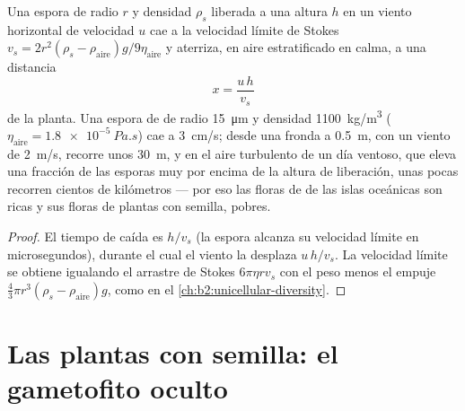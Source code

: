 \begin{theorem}\label{thm:b2:plant-life-cycles:dispersal}
Una espora de radio $r$ y densidad $\rho_s$ liberada a una altura $h$ en
un viento horizontal de velocidad $u$ cae a la velocidad límite de
Stokes
$v_s = 2r^2(\rho_s - \rho_{\text{aire}})g/9\eta_{\text{aire}}$
y aterriza, en aire estratificado en calma, a una distancia
\[
x = \frac{u\,h}{v_s}
\]
de la planta. Una espora de  de radio \qty{15}{\micro m} y
densidad \qty{1100}{kg/m^3} ($\eta_{\text{aire}} = \qty{1.8e-5}{Pa.s}$)
cae a \qty{3}{cm/s}; desde una fronda a \qty{0.5}{m}, con un viento de
\qty{2}{m/s}, recorre unos \qty{30}{m}, y en el aire turbulento de un día
ventoso, que eleva una fracción de las esporas muy por encima de la
altura de liberación, unas pocas recorren cientos de kilómetros --- por
eso las floras de  de las islas oceánicas son ricas y sus floras
de plantas con semilla, pobres.
\end{theorem}
\begin{proof}
El tiempo de caída es $h/v_s$ (la espora alcanza su velocidad límite en
microsegundos), durante el cual el viento la desplaza $u\,h/v_s$. La
velocidad límite se obtiene igualando el arrastre de Stokes $6\pi\eta r
v_s$ con el peso menos el empuje $\tfrac43\pi r^3(\rho_s -
\rho_{\text{aire}})g$, como en el \cref{ch:b2:unicellular-diversity}.
\end{proof}

\section{Las plantas con semilla: el gametofito oculto}

